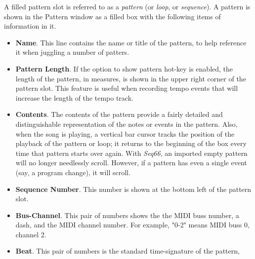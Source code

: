    A filled pattern slot is referred to as a \textsl{pattern}
   (or \textsl{loop}, or \textsl{sequence}).
   A pattern is shown in the Pattern window as a filled box with the
   following items of information in it.

   \begin{itemize}
      \item \textbf{Name}.
         This line contains the name or title of the pattern, to help
         reference it when juggling a number of patters.
      \item \textbf{Pattern Length}.
         If the option to show pattern hot-key is enabled, the length of the
         pattern, in measures, is shown in the upper right corner of the
         pattern slot.  This feature is useful when recording tempo events that
         will increase the length of the tempo track.
      \item \textbf{Contents}.
         The contents of the pattern provide a fairly detailed and
         distinguishable representation of the notes or events in the
         pattern.  Also, when the song is playing, a vertical bar cursor
         tracks the position of the playback of the pattern or loop; it
         returns to the beginning of the box every time that pattern starts
         over again.
         With \textsl{Seq66}, an imported empty pattern will no longer
         needlessly scroll.
         However, if a pattern has even a single event (say, a program change),
         it will scroll.
      \item \textbf{Sequence Number}.
         This number is shown at the bottom left of the pattern slot.
      \item \textbf{Bus-Channel}.
         This pair of numbers shows the the MIDI buss number, a dash, and
         the MIDI channel number.
         For example, "0-2" means MIDI buss 0, channel 2.
      \item \textbf{Beat}.
         This pair of numbers is the standard time-signature of the pattern,

\end{itemize}
